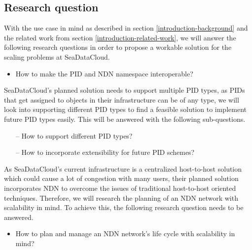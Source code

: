 \subsection{Research question}
\label{introduction-research-question}
With the use case in mind as described in section \ref{introduction-background} and the related work from section \ref{introduction-related-work}, we will answer the following research questions in order to propose a workable solution for the scaling problems at SeaDataCloud.


\begin{itemize}
	\item How to make the PID and NDN namespace interoperable?
\end{itemize}

SeaDataCloud's planned solution needs to support multiple PID types, as PIDs that get assigned to objects in their infrastructure can be of any type, we will look into supporting different PID types to find a feasible solution to implement future PID types easily. This will be answered with the following sub-questions.
\begin{itemize}
    \item[--] How to support different PID types?
    \item[--] How to incorporate extensibility for future PID schemes?
\end{itemize}

As SeaDataCloud's current infrastructure is a centralized host-to-host solution 
which could cause a lot of congestion with many users, their planned solution incorporates NDN to overcome the issues of traditional host-to-host oriented techniques. Therefore, we will research the planning of an NDN network with scalability in mind. To achieve this, the following research question needs to be answered.   
\begin{itemize}
    \item How to plan and manage an NDN network's life cycle with scalability in mind?
\end{itemize}


